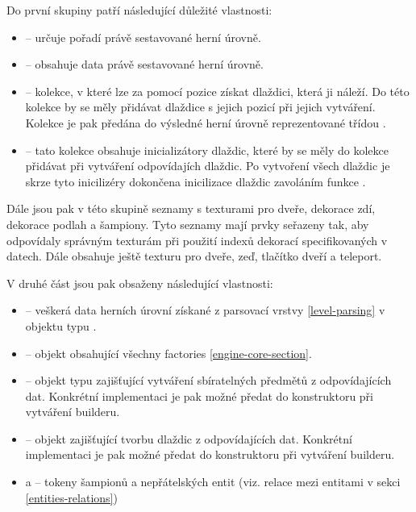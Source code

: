 Do první skupiny patří následující důležité vlastnosti:
\begin{itemize}
\item {} -- určuje pořadí právě sestavované herní úrovně.
\item {} -- obsahuje data právě sestavované herní úrovně.
\item {} -- kolekce, v které lze za pomocí pozice získat dlaždici, která ji náleží.
	Do této kolekce by se měly přidávat dlaždice s jejich pozicí při jejich vytváření.
	Kolekce je pak předána do výsledné herní úrovně reprezentované třídou .

\item {} -- tato kolekce obsahuje inicializátory dlaždic, které by se měly 
	 do kolekce přidávat při vytváření odpovídajích dlaždic. Po vytvoření všech dlaždic je skrze tyto 
	 inicilizéry dokončena inicilizace dlaždic zavoláním funkce .
\end{itemize}
Dále jsou pak v této skupině seznamy s texturami pro dveře, dekorace zdí, dekorace podlah a šampiony. Tyto seznamy mají prvky seřazeny tak, aby odpovídaly 
správným texturám při použití indexů dekorací specifikovaných v datech. Dále obsahuje ještě texturu pro 
dveře, zeď, tlačítko dveří a teleport.

V druhé část jsou pak obsaženy následující vlastnosti:
\begin{itemize}
\item {} -- veškerá data herních úrovní získané z parsovací vrstvy \vref{level-parsing} v objektu typu .
\item {} -- objekt obsahující všechny factories \vref{engine-core-section}.
\item {} -- objekt typu  zajišťující vytváření sbíratelných předmětů z odpovídajících dat.
	Konkrétní implementaci je pak možné předat do konstruktoru při vytváření builderu.
\item {} -- objekt  zajišťující tvorbu dlaždic z odpovídajících dat.
	Konkrétní implementaci je pak možné předat do konstruktoru při vytváření builderu.
\item {} a  -- tokeny šampionů a nepřátelských entit (viz. relace mezi entitami v sekci \ref{entities-relations}) 
\end{itemize}

